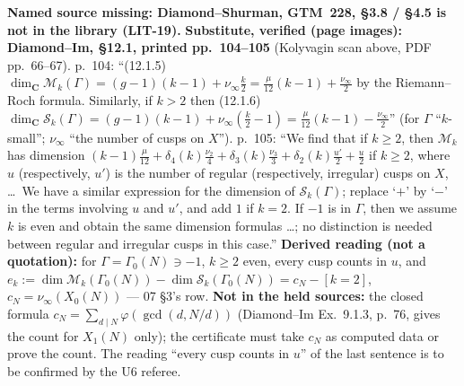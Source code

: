 \begin{hypothesis}\label{lit:hz-eis-dim}
  \textbf{Named source missing: Diamond--Shurman, GTM~228, \S3.8 / \S4.5 is not in the library (LIT-19).}
  \textbf{Substitute, verified (page images): Diamond--Im, \S12.1, printed pp.~104--105} (Kolyvagin scan above, PDF pp.~66--67).
  p.~104: ``(12.1.5) $\dim_{\mathbf C}\mathcal M_k(\Gamma)=(g-1)(k-1)+\nu_\infty\frac k2=\frac{\mu}{12}(k-1)+\frac{\nu_\infty}{2}$ by the
  Riemann--Roch formula. Similarly, if $k>2$ then (12.1.6) $\dim_{\mathbf C}\mathcal S_k(\Gamma)=(g-1)(k-1)+\nu_\infty(\frac k2-1)
  =\frac{\mu}{12}(k-1)-\frac{\nu_\infty}{2}$'' (for $\Gamma$ ``$k$-small''; $\nu_\infty$ ``the number of cusps on $X$''). p.~105: ``We find that
  if $k\ge2$, then $\mathcal M_k$ has dimension $(k-1)\frac{\mu}{12}+\delta_4(k)\frac{\nu_2}{4}+\delta_3(k)\frac{\nu_3}{3}+\delta_2(k)\frac{u'}{2}+\frac u2$
  if $k\ge2$, where $u$ (respectively, $u'$) is the number of regular (respectively, irregular) cusps on $X$, \dots\ We have a similar
  expression for the dimension of $\mathcal S_k(\Gamma)$; replace `$+$' by `$-$' in the terms involving $u$ and $u'$, and add $1$ if $k=2$.
  If $-1$ is in $\Gamma$, then we assume $k$ is even and obtain the same dimension formulas \dots; no distinction is needed between
  regular and irregular cusps in this case.''
  \textbf{Derived reading (not a quotation):} for $\Gamma=\Gamma_0(N)\ni-1$, $k\ge2$ even, every cusp counts in $u$, and
  $e_k:=\dim\mathcal M_k(\Gamma_0(N))-\dim\mathcal S_k(\Gamma_0(N))=c_N-[k=2]$, $c_N=\nu_\infty(X_0(N))$ --- 07 \S3's row.
  \textbf{Not in the held sources:} the closed formula $c_N=\sum_{d\mid N}\varphi(\gcd(d,N/d))$ (Diamond--Im Ex.~9.1.3, p.~76, gives the
  count for $X_1(N)$ only); the certificate must take $c_N$ as computed data or prove the count. The reading ``every cusp counts in $u$''
  of the last sentence is to be confirmed by the U6 referee.
\end{hypothesis}

